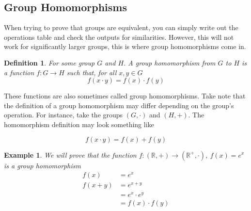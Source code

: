 \documentclass[12pt,journal,compsoc]{IEEEtran}
\newcommand{\R}{\mathbb{R}}
\newtheorem{definition}{Definition}
\newtheorem{ex}[thm]{Example}
\begin{document}
\subsection{Group Homomorphisms}
When trying to prove that groups are equivalent, you can simply write out the operations table and check the outputs for similarities. However, this will not work for significantly larger groups, this is where group homomorphisms come in. 

\begin{definition}
For some group $G$ and $H$. A group homomorphism from $G$ to $H$ is a function $f: G \rightarrow H$ such that, for all $x,y \in G$
\[ f(x \cdot y) = f(x) \cdot f(y) \]
\end{definition}
These functions are also sometimes called group homomorphisms. Take note that the definition of a group homomorphism may differ depending on the group's operation. For instance, take the groups $(G, \cdot)$ and $(H, +)$. The homomorphism definition may look something like 

\[ f(x \cdot y) = f(x) + f(y) \]

\begin{ex}
We will prove that the function $f:(\R, +) \rightarrow (\R^{+}, \cdot)$, $f(x) = e^x$ is a group homomorphism
\begin{align*}
	f(x) &= e^x\\
	f(x + y)&= e^{x+y}\\
	&= e^x \cdot e^y \\
	&= f(x) \cdot f(y)
\end{align*}
\end{ex}
\end{document}
